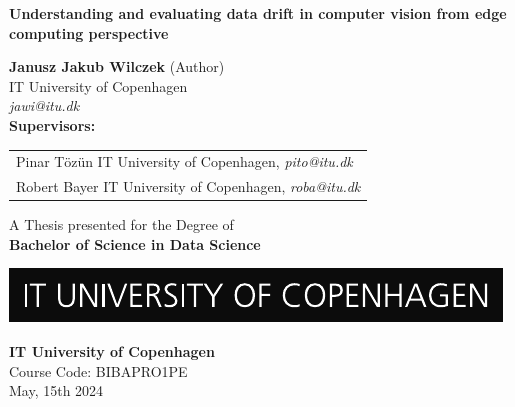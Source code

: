 \begin{titlepage}
  \begin{center}

    \vspace*{1cm}

    \textbf{\LARGE
    Understanding and evaluating data drift in computer vision from edge computing perspective
    }

    \vspace{1.5cm}

    \begin{center}
      \textbf{Janusz Jakub Wilczek} (Author) \\
      IT University of Copenhagen \\
      \textit{jawi@itu.dk} \\
      \vspace{0.5cm}  %
      \textbf{Supervisors:} \\
      \begin{tabular}{@{}l@{}}
        Pinar Tözün IT University of Copenhagen, \textit{pito@itu.dk} \\
        Robert Bayer IT University of Copenhagen, \textit{roba@itu.dk}
      \end{tabular}
    \end{center}

    \vfill

    A Thesis presented for the Degree of \\
    \textbf{Bachelor of Science in Data Science}

    \vspace{0.8cm}

    \includegraphics{ITULogo}

    \vspace{0.8cm}


    \textbf{IT University of Copenhagen}\\
    Course Code: BIBAPRO1PE  \\
    \vspace{.5cm}
    May, 15th 2024

  \end{center}
\end{titlepage}
